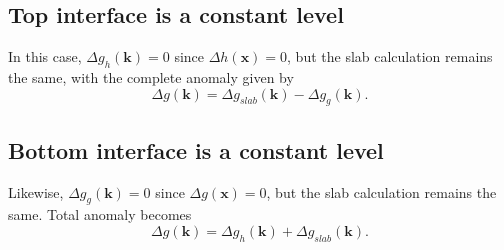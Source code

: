 \documentclass[12pt,letterpaper,margin=0.5in]{report}
\begin{document}
\subsection*{Top interface is a constant level}
In this case, $\Delta g_h(\mathbf{k}) = 0$ since $\Delta h(\mathbf{x}) = 0$, but the slab calculation remains the same, with the complete anomaly
given by
\begin{equation}
\Delta g(\mathbf{k}) = \Delta g_{slab}(\mathbf{k}) - \Delta g_g(\mathbf{k}).
\label{q:total2}
\end{equation}
\subsection*{Bottom interface is a constant level}
Likewise, $\Delta g_g(\mathbf{k}) = 0$ since $\Delta g(\mathbf{x}) = 0$, but the slab calculation remains the same.  Total anomaly becomes
\begin{equation}
\Delta g(\mathbf{k}) = \Delta g_h(\mathbf{k}) + \Delta g_{slab}(\mathbf{k}).
\label{q:total3}
\end{equation}
\end{document}
